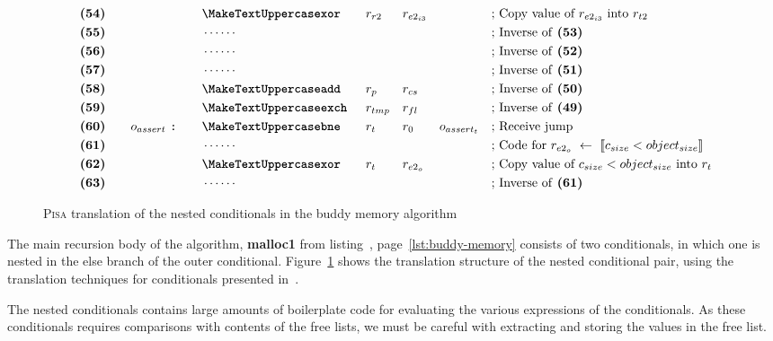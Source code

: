 \begin{figure}[ht]
\begin{subfigure}{.7\textwidth}
{\begin{minipage}{\linewidth}
\begin{alignat*}{7}
                &\textbf{(54)}\quad&& &&\inst{xor} &&r_{r2} && r_{e2_{i3}} && && \text{; Copy value of $r_{e2_{i3}}$ into $r_{t2}$}\\
                &\textbf{(55)}\quad&& &&\cdots\cdots && && && &&\text{; Inverse of \textbf{(53)}}\\
                &\textbf{(56)}\quad&& &&\cdots\cdots && && && &&\text{; Inverse of \textbf{(52)}}\\
                &\textbf{(57)}\quad&& &&\cdots\cdots && && && &&\text{; Inverse of \textbf{(51)}}\\
                &\textbf{(58)}\quad&& &&\inst{add} &&r_{p} && r_{cs} && && \text{; Inverse of \textbf{(50)}}\\
                &\textbf{(59)}\quad&& &&\inst{exch} &&r_{tmp} && r_{fl} && && \text{; Inverse of \textbf{(49)}}\\
                &\textbf{(60)}\quad&&o_{assert}\ \texttt{:}\quad &&\inst{bne} &&r_{t} && r_0 && o_{assert_t} && \text{; Receive jump}\\
                &\textbf{(61)}\quad&& &&\cdots\cdots && && && &&\text{; Code for $r_{e2_o}\ \leftarrow\ \llbracket c_{size} < object_{size} \rrbracket$}\\
                &\textbf{(62)}\quad&& &&\inst{xor}\quad &&r_t && r_{e2_o} && &&\text{; Copy value of $c_{size} < object_{size}$ into $r_t$}\\        
                &\textbf{(63)}\quad&& &&\cdots\cdots && && && &&\text{; Inverse of \textbf{(61)}}\\ 
            \end{alignat*}
        \end{minipage}
    }
    \end{subfigure}
    \caption{\textsc{Pisa} translation of the nested conditionals in the buddy memory algorithm}
    \label{fig:pisa-buddy-conditionals}
\end{figure}

The main recursion body of the algorithm, \textbf{malloc1} from listing~\pageref{lst:buddy-memory}, page~\ref{lst:buddy-memory} consists of two conditionals, in which one is nested in the else branch of the outer conditional. Figure~\ref{fig:pisa-buddy-conditionals} shows the translation structure of the nested conditional pair, using the translation techniques for conditionals presented in~\cite{ha:translation}.

The nested conditionals contains large amounts of boilerplate code for evaluating the various expressions of the conditionals. As these conditionals requires comparisons with contents of the free lists, we must be careful with extracting and storing the values in the free list. 

